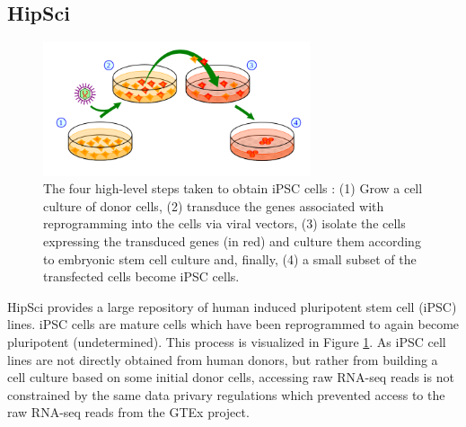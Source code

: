 \subsection{HipSci} \label{subsec:hipsci}
\begin{figure}
	\centering\includegraphics[width=0.7\textwidth]{../visualizations/ch4-methods/ipscprocess.png} 
	\caption[test.]{
	The four high-level steps taken to obtain iPSC cells \cite{img:ipscprocess}:
	(1) Grow a cell culture of donor cells, (2) transduce the genes associated with reprogramming into the cells via viral vectors, (3) isolate the cells expressing the transduced genes (in red) and culture them according to embryonic stem cell culture and, finally, (4) a small subset of the transfected cells become iPSC cells.
}
	\label{fig:ipscprocess}
\end{figure}

HipSci provides a large repository of human induced pluripotent stem cell (iPSC) lines. iPSC cells are mature cells which have been reprogrammed to again become pluripotent (undetermined). This process is visualized in Figure \ref{fig:ipscprocess}. As iPSC cell lines are not directly obtained from human donors, but rather from building a cell culture based on some initial donor cells, accessing raw RNA-seq reads is not constrained by the same data privary regulations which prevented access to the raw RNA-seq reads from the GTEx project.


